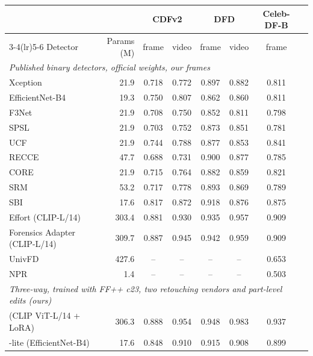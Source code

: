 \begin{tabular}{lrcccccc}
\toprule
 & & \multicolumn{2}{c}{CDFv2} & \multicolumn{2}{c}{DFD} & Celeb-DF-B \\
\cmidrule(lr){3-4}\cmidrule(lr){5-6}
Detector & Params (M) & frame & video & frame & video & frame \\
\midrule
\multicolumn{7}{l}{\textit{Published binary detectors, official weights, our frames}} \\
Xception & 21.9 & 0.718 & 0.772 & 0.897 & 0.882 & 0.811 \\
EfficientNet-B4 & 19.3 & 0.750 & 0.807 & 0.862 & 0.860 & 0.811 \\
F3Net & 21.9 & 0.708 & 0.750 & 0.852 & 0.811 & 0.798 \\
SPSL & 21.9 & 0.703 & 0.752 & 0.873 & 0.851 & 0.781 \\
UCF & 21.9 & 0.744 & 0.788 & 0.877 & 0.853 & 0.841 \\
RECCE & 47.7 & 0.688 & 0.731 & 0.900 & 0.877 & 0.785 \\
CORE & 21.9 & 0.715 & 0.764 & 0.882 & 0.859 & 0.821 \\
SRM & 53.2 & 0.717 & 0.778 & 0.893 & 0.869 & 0.789 \\
SBI & 17.6 & 0.817 & 0.872 & 0.918 & 0.876 & 0.875 \\
Effort (CLIP-L/14) & 303.4 & 0.881 & 0.930 & 0.935 & 0.957 & 0.909 \\
Forensics Adapter (CLIP-L/14) & 309.7 & 0.887 & 0.945 & 0.942 & 0.959 & 0.909 \\
UnivFD & 427.6 & -- & -- & -- & -- & 0.653 \\
NPR & 1.4 & -- & -- & -- & -- & 0.503 \\
\midrule
\multicolumn{7}{l}{\textit{Three-way, trained with FF++ c23, two retouching vendors and part-level edits (ours)}} \\
\textbf{\ours{}} (CLIP ViT-L/14 + LoRA) & 306.3 & 0.888 & 0.954 & 0.948 & 0.983 & 0.937 \\
\ours{}-lite (EfficientNet-B4) & 17.6 & 0.848 & 0.910 & 0.915 & 0.908 & 0.899 \\
\bottomrule
\end{tabular}
